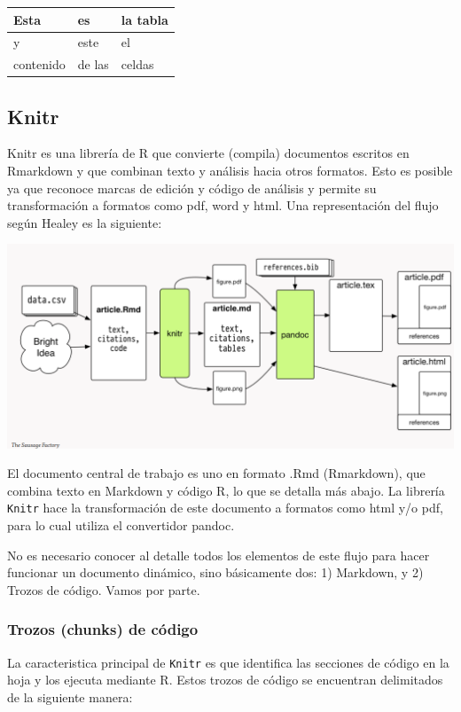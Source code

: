 \documentclass[11pt,]{book}
\begin{document}
\begin{longtable}[]{@{}lll@{}}
\toprule
Esta & es & la tabla\tabularnewline
\midrule
\endhead
y & este & el\tabularnewline
contenido & de las & celdas\tabularnewline
\bottomrule
\end{longtable}

\hypertarget{knitr}{%
\subsection{Knitr}\label{knitr}}

Knitr es una librería de R que convierte (compila) documentos escritos en Rmarkdown y que combinan texto y análisis hacia otros formatos. Esto es posible ya que reconoce marcas de edición y código de análisis y permite su transformación a formatos como pdf, word y html. Una representación del flujo según Healey es la siguiente:

\includegraphics{images/healeysworkflow.png}

El documento central de trabajo es uno en formato .Rmd (Rmarkdown), que combina texto en Markdown y código R, lo que se detalla más abajo. La librería \texttt{Knitr} hace la transformación de este documento a formatos como html y/o pdf, para lo cual utiliza el convertidor pandoc.

No es necesario conocer al detalle todos los elementos de este flujo para hacer funcionar un documento dinámico, sino básicamente dos: 1) Markdown, y 2) Trozos de código. Vamos por parte.

\hypertarget{trozos-chunks-de-cuxf3digo}{%
\subsubsection{Trozos (chunks) de código}\label{trozos-chunks-de-cuxf3digo}}

La caracteristica principal de \texttt{Knitr} es que identifica las secciones de código en la hoja y los ejecuta mediante R. Estos trozos de código se encuentran delimitados de la siguiente manera:
\end{document}
